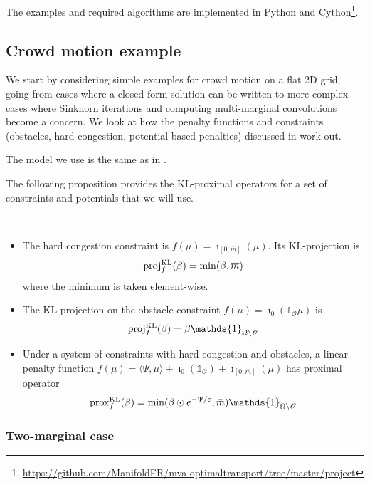 \documentclass[../report.tex]{subfiles}
\begin{document}
The examples and required algorithms are implemented in Python and Cython\footnote{\url{https://github.com/ManifoldFR/mva-optimaltransport/tree/master/project}}.

\subsection{Crowd motion example}

We start by considering simple examples for crowd motion on a flat 2D grid, going from cases where a closed-form solution can be written to more complex cases where Sinkhorn iterations and computing multi-marginal convolutions become a concern. We look at how the penalty functions and constraints (obstacles, hard congestion, potential-based penalties) discussed in \textcite{benamou:hal-01295299} work out.

The model we use is the same as in \textcite{peyr2015entropic}.

The following proposition provides the KL-proximal operators for a set of constraints and potentials that we will use.
\begin{prop}\label{prop:KLproxExamples}~
\begin{itemize}
	\item The hard congestion constraint is $f(\mu) = \imath_{[0,\overline{m}]}(\mu)$. Its KL-projection is
	\begin{equation}
	\operatorname{proj}^{\operatorname{KL}}_f(\beta) = \min(\beta,\overline{m})
	\end{equation}
	where the minimum is taken element-wise.
	\item The KL-projection on the obstacle constraint $f(\mu) = \imath_{0} (\mathds{1}_\mathscr{O}\mu)$ is
	\begin{equation}
	\proj^{\KL}_f (\beta) = \beta \mathds{1}_{\Omega\backslash\mathscr{O}}
	\end{equation}
	\item Under a system of constraints with hard congestion and obstacles, a linear penalty function $f(\mu) = \langle\Psi, \mu\rangle + \imath_0(\mathds{1}_\mathscr{O}) + \imath_{[0,\bar{m}]}(\mu)$ has proximal operator
	\begin{equation}
	\prox^{\KL}_{f}(\beta) =
	\min(\beta\odot e^{-\Psi/\epsilon}, \bar{m}) \mathds{1}_{\Omega\backslash\mathscr{O}}
	\end{equation}
\end{itemize}
\end{prop}

\subsubsection{Two-marginal case}
\end{document}
